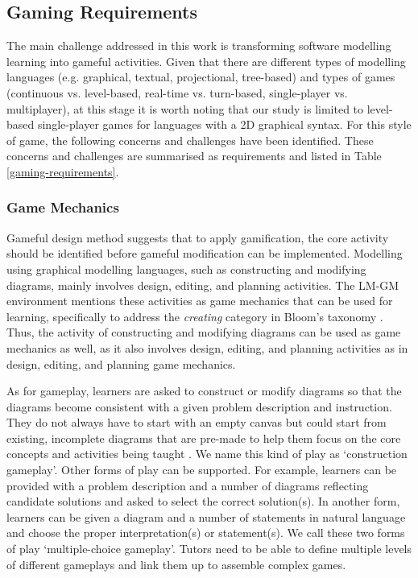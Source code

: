 \documentclass[12pt, a4paper]{report} \usepackage[titletoc]{appendix}
\begin{document}
\subsection{Gaming Requirements}
\label{Gaming Requirements}
The main challenge addressed in this work is transforming software modelling learning into gameful activities. Given that there are different types of modelling languages (e.g. graphical, textual, projectional, tree-based) and types of games (continuous vs. level-based, real-time vs. turn-based, single-player vs. multiplayer), at this stage it is worth noting that our study is limited to level-based single-player games for languages with a 2D graphical syntax. For this style of game, the following concerns and challenges have been identified. These concerns and challenges are summarised as requirements and listed in Table \ref{gaming-requirements}.

\subsubsection{Game Mechanics} 
\label{Game Mechanics} 
Gameful design method \cite{deterding2015lens} suggests that to apply gamification, the core activity should be identified before gameful modification can be implemented. Modelling using graphical modelling languages, such as constructing and modifying diagrams, mainly involves design, editing, and planning activities. The LM-GM environment \cite{arnab2015mapping} mentions these activities as game mechanics that can be used for learning, specifically to address the \emph{creating} category in Bloom's taxonomy \cite{krathwohl2002revision}. Thus, the activity of constructing and modifying diagrams can be used as game mechanics as well, as it also involves design, editing, and planning activities as in design, editing, and planning game mechanics.

As for gameplay, learners are asked to construct or modify diagrams so that the diagrams become consistent with a given problem description and instruction. They do not always have to start with an empty canvas but could start from existing, incomplete diagrams that are pre-made to help them focus on the core concepts and activities being taught \cite{deterding2015lens}. We name this kind of play as `construction gameplay'. Other forms of play can be supported. For example, learners can be provided with a problem description and a number of diagrams reflecting candidate solutions and asked to select the correct solution(s). In another form, learners can be given a diagram and a number of statements in natural language and choose the proper interpretation(s) or statement(s). We call these two forms of play `multiple-choice gameplay'. Tutors need to be able to define multiple levels of different gameplays and link them up to assemble complex games. 
\end{document}
